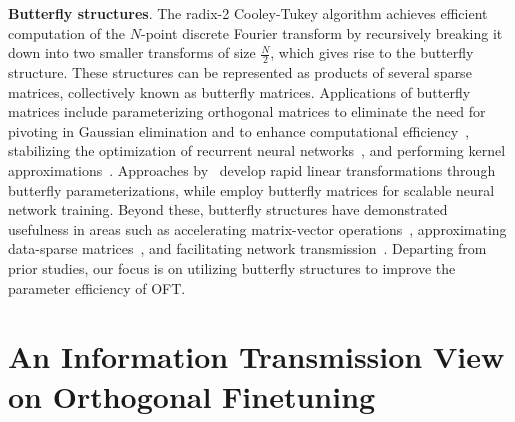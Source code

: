 \textbf{Butterfly structures}. The radix-2 Cooley-Tukey algorithm achieves efficient computation of the $N$-point discrete Fourier transform by recursively breaking it down into two smaller transforms of size $\frac{N}{2}$, which gives rise to the butterfly structure. These structures can be represented as products of several sparse matrices, collectively known as butterfly matrices. Applications of butterfly matrices include parameterizing orthogonal matrices to eliminate the need for pivoting in Gaussian elimination and to enhance computational efficiency~\cite{parker1995random}, stabilizing the optimization of recurrent neural networks~\cite{jing2017tunable}, and performing kernel approximations~\cite{munkhoeva2018quadrature}. Approaches by~\cite{dao2019learning,dao2019kaleidoscope} develop rapid linear transformations through butterfly parameterizations, while \cite{chen2022pixelated,dao2022monarch} employ butterfly matrices for scalable neural network training. Beyond these, butterfly structures have demonstrated usefulness in areas such as accelerating matrix-vector operations~\cite{michielssen1996multilevel,o2010algorithm}, approximating data-sparse matrices~\cite{li2015butterfly}, and facilitating network transmission~\cite{klasing1994broadcasting,li2003linear,rajasingh2016transmission}. Departing from prior studies, our focus is on utilizing butterfly structures to improve the parameter efficiency of OFT.

\section{An Information Transmission View on Orthogonal Finetuning}

